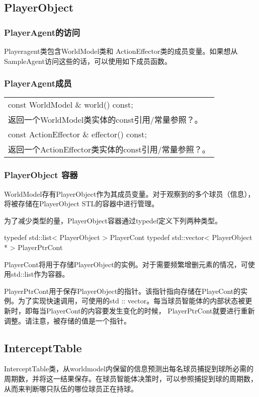 \subsection{PlayerObject}
\subsubsection{PlayerAgent的访问}

Playeragent类包含WorldModel类和 ActionEffector类的成员变量。如果想从SampleAgent访问这些的话，可以使用如下成员函数。
\subsubsection{PlayerAgent成员}

\begin{tabular}{p{}}
	\hline	
const WorldModel \& world() const;\\
返回一个WorldModel类实体的const引用/常量参照？。\\ 
	\hline
const ActionEffector \& effector() const;\\
返回一个ActionEffector类实体的const引用/常量参照？。\\
	\hline	
\end{tabular}



\subsubsection{PlayerObject 容器}

WorldModel存有PlayerObject作为其成员变量。对于观察到的多个球员（信息），将被存储在PlayerObject STL的容器中进行管理。

为了减少类型的量，PlayerObject容器通过typedef定义下列两种类型。

\begin{Code}
typedef std::list< PlayerObject > PlayerCont
typedef std::vector< PlayerObject * > PlayerPtrCont
\end{Code}

PlayerCont将用于存储PlayerObject的实例。对于需要频繁增删元素的情况，可使用std::list作为容器。

PlayerPtrCont用于保存PlayerObject的指针。该指针指向存储在PlayeCont的实例。为了实现快速调用，可使用的std :: vector。每当球员智能体的内部状态被更新时，即每当PlayerCont的内容要发生变化的时候， PlayerPtrCont就要进行重新调整。请注意，被存储的值是一个指针。


\subsection{InterceptTable}
InterceptTable类，从worldmodel内保留的信息预测出每名球员捕捉到球所必需的周期数，并将这一结果保存。在球员智能体决策时，可以参照捕捉到球的周期数，从而来判断哪只队伍的哪位球员正在持球。


